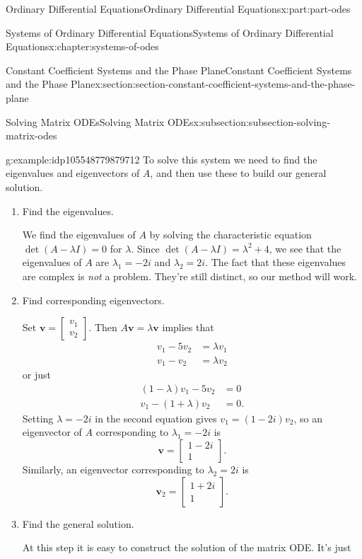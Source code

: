 \documentclass[oneside,10pt,]{book}
\numberwithin{equation}{part}
\renewcommand{\vec}[1]{\mathbf{#1}}
\newcommand{\amp}{&}
\begin{document}
\begin{partptx}{Ordinary Differential Equations}{}{Ordinary Differential Equations}{}{}{x:part:part-odes}
\begin{chapterptx}{Systems of Ordinary Differential Equations}{}{Systems of Ordinary Differential Equations}{}{}{x:chapter:systems-of-odes}
\begin{sectionptx}{Constant Coefficient Systems and the Phase Plane}{}{Constant Coefficient Systems and the Phase Plane}{}{}{x:section:section-constant-coefficient-systems-and-the-phase-plane}
\begin{subsectionptx}{Solving Matrix ODEs}{}{Solving Matrix ODEs}{}{}{x:subsection:subsection-solving-matrix-odes}
\begin{example}{}{g:example:idp105548779879712}
To solve this system we need to find the eigenvalues and eigenvectors of \(A\), and then use these to build our general solution.%
\begin{enumerate}
\item{}Find the eigenvalues.%
\par
We find the eigenvalues of \(A\) by solving the characteristic equation \(\det(A - \lambda I) = 0\) for \(\lambda\). Since \(\det(A - \lambda I) = \lambda^{2}+4\), we see that the eigenvalues of \(A\) are \(\lambda_{1} = -2i\) and \(\lambda_{2} = 2i\). The fact that these eigenvalues are complex is \emph{not} a problem. They're still distinct, so our method will work.%
\item{}Find corresponding eigenvectors.%
\par
Set \(\vec{v} = \begin{bmatrix}v_{1} \\ v_{2}\end{bmatrix}\). Then \(A\vec{v} = \lambda\vec{v}\) implies that%
\begin{align*}
v_{1} - 5v_{2}  \amp =  \lambda v_{1}\\
v_{1} -v_{2}  \amp =  \lambda v_{2}
\end{align*}
or just%
\begin{align*}
(1-\lambda)v_{1} - 5v_{2} \amp =0\\
v_{1} - (1+\lambda)v_{2} \amp = 0.
\end{align*}
Setting \(\lambda=-2i\) in the second equation gives \(v_{1} = (1-2i)v_{2}\), so an eigenvector of \(A\) corresponding to \(\lambda_{1} = -2i\) is%
\begin{equation*}
\vec{v} = \begin{bmatrix}1-2i \\ 1\end{bmatrix}.
\end{equation*}
Similarly, an eigenvector corresponding to \(\lambda_{2}=2i\) is%
\begin{equation*}
\vec{v}_{2} = \begin{bmatrix}1+2i\\1\end{bmatrix}.
\end{equation*}
%
\item{}Find the general solution.%
\par
At this step it is easy to construct the solution of the matrix ODE. It's just%
\begin{equation*}

\end{equation*}
\end{enumerate}
\end{example}
\end{subsectionptx}
\end{sectionptx}
\end{chapterptx}
\end{partptx}
\end{document}
